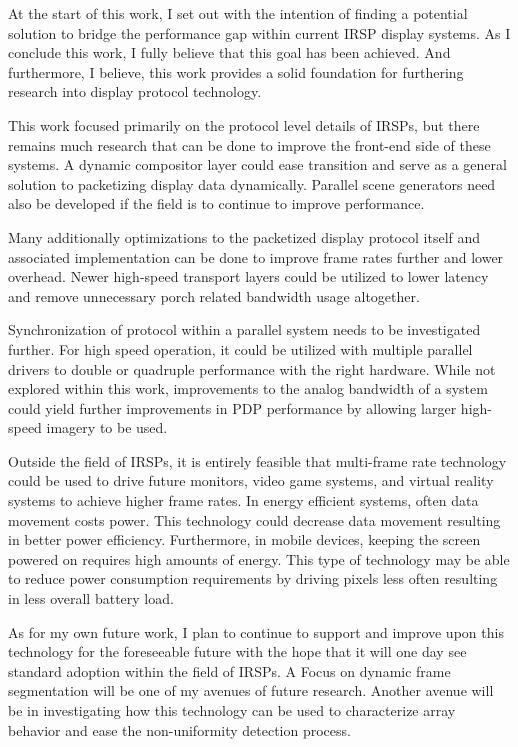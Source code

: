 At the start of this work, I set out with the intention of finding a potential solution to bridge the performance gap within current IRSP display systems. As I conclude this work, I fully believe that this goal has been achieved. And furthermore, I believe, this work provides a solid foundation for furthering research into display protocol technology.

This work focused primarily on the protocol level details of IRSPs, but there remains much research that can be done to improve the front-end side of these systems. A dynamic compositor layer could ease transition and serve as a general solution to packetizing display data dynamically. Parallel scene generators need also be developed if the field is to continue to improve performance.

Many additionally optimizations to the packetized display protocol itself and associated implementation can be done to improve frame rates further and lower overhead. Newer high-speed transport layers could be utilized to lower latency and remove unnecessary porch related bandwidth usage altogether.

Synchronization of protocol within a parallel system needs to be investigated further. For high speed operation, it could be utilized with multiple parallel drivers to double or quadruple performance with the right hardware. While not explored within this work, improvements to the analog bandwidth of a system could yield further improvements in PDP performance by allowing larger high-speed imagery to be used.

Outside the field of IRSPs, it is entirely feasible that multi-frame rate technology could be used to drive future monitors, video game systems, and virtual reality systems to achieve higher frame rates. In energy efficient systems, often data movement costs power. This technology could decrease data movement resulting in better power efficiency. Furthermore, in mobile devices, keeping the screen powered on requires high amounts of energy. This type of technology may be able to reduce power consumption requirements by driving pixels less often resulting in less overall battery load.

As for my own future work, I plan to continue to support and improve upon this technology for the foreseeable future with the hope that it will one day see standard adoption within the field of IRSPs. A Focus on dynamic frame segmentation will be one of my avenues of future research. Another avenue will be in investigating how this technology can be used to characterize array behavior and ease the non-uniformity detection process.
